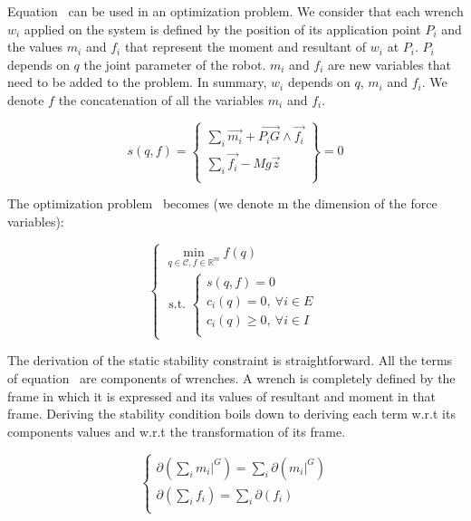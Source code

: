 Equation~ can be used in an optimization problem.
We consider that each wrench $w_i$ applied on the system is defined by the position of its application point $P_i$ and the values $m_i$ and $f_i$ that represent the moment and resultant of $w_i$ at $P_i$.
$P_i$ depends on $q$ the joint parameter of the robot.
$m_i$ and $f_i$ are new variables that need to be added to the problem.
In summary, $w_i$ depends on $q$, $m_i$ and $f_i$.
We denote $f$ the concatenation of all the variables $m_i$ and $f_i$.

\begin{equation}
  \boxed{s(q,f) = \left\{
  \begin{array}{r}
    \sum\limits_i \vec{m_i} + \overrightarrow{P_i G}\wedge \vec{f_i} \\
    \sum\limits_i \vec{f_i} - Mg\vec{z} \\
  \end{array}
  \right\}
  = 0}
\end{equation}

The optimization problem~ becomes (we denote m the dimension of the force variables):

\begin{equation}
\label{eq:optim_form_PG_with_stab}
  \left\{
  \begin{array}{l}
    \min\limits_{q\in\mathcal{C}, f\in \mathbb{R}^m}{f(q)}\\
    \text{ s.t. }
    \left\{
    \begin{array}{l}
      s(q,f) = 0\\
      c_i(q) = 0,\ \forall i\in{E}\\
      c_i(q) \geq 0,\ \forall i\in{I}\\
    \end{array}
    \right.
  \end{array}
  \right.
\end{equation}

The derivation of the static stability constraint is straightforward.
All the terms of equation~ are components of wrenches.
A wrench is completely defined by the frame in which it is expressed and its values of resultant and moment in that frame.
Deriving the stability condition boils down to deriving each term w.r.t its components values and w.r.t the transformation of its frame.

\begin{equation}
\left\{
\begin{array}{r}
  \partial\left(\sum\limits_i m_i|^G\right) = \sum\limits_i \partial(m_i|^G) \\
  \partial\left(\sum\limits_i f_i\right) = \sum\limits_i \partial(f_i) \\
\end{array}
\right.
\label{eq:derivation_stability}
\end{equation}

